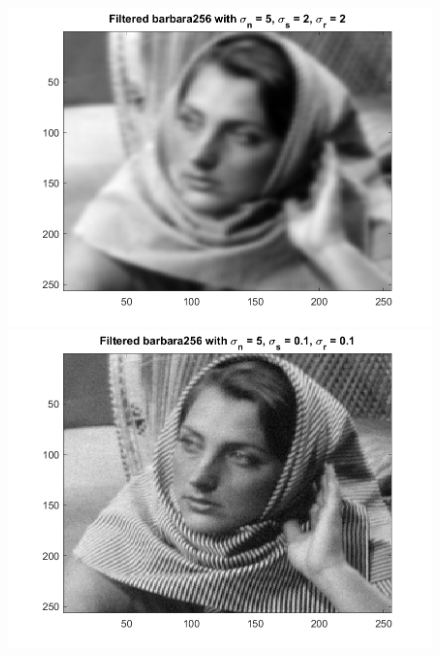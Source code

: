\documentclass{article}
\begin{document}
\begin{figure}[!htb]
    \centering
    \begin{minipage}[b]{0.3\textwidth}
        \includegraphics[width=\textwidth]{barbara256_5_2_2_5.png}
    \end{minipage}
    \begin{minipage}[b]{0.3\textwidth}
        \includegraphics[width=\textwidth]{barbara256_5_0.1_0.1_7.png}
    \end{minipage}
    \begin{minipage}[b]{0.3\textwidth}

\end{minipage}
\end{figure}
\end{document}
